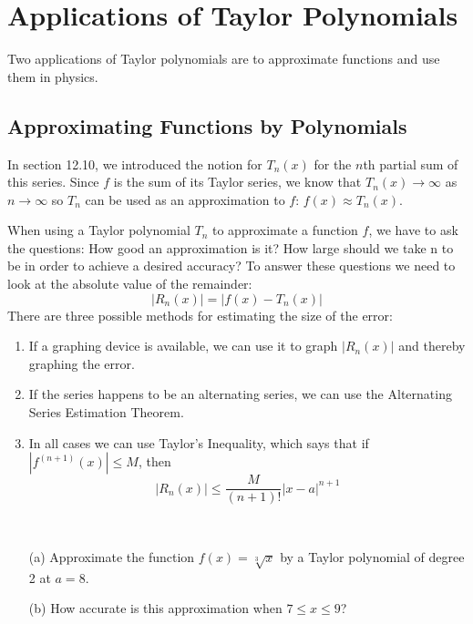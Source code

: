 \section{Applications of Taylor Polynomials}
  Two applications of Taylor polynomials are to approximate functions and use them in physics.
  \subsection*{Approximating Functions by Polynomials}
    In section 12.10, we introduced the notion for $T_n (x)$ for the $n$th partial sum of this series. Since $f$ is the sum of its Taylor series, we know that $T_n (x) \to \infty$ as $n\to\infty$ so $T_n$ can be used as an approximation to $f$: $f(x) \approx T_n (x)$.\par
    When using a Taylor polynomial $T_n$ to approximate a function $f$, we have to ask the questions: How good an approximation is it? How large should we take n to be in order to achieve a desired accuracy? To answer these questions we need to look at the absolute value of the remainder:
    $$|R_n (x)| = |f(x) - T_n (x)|$$
    There are three possible methods for estimating the size of the error:
    \begin{enumerate}
      \item If a graphing device is available, we can use it to graph $|R_n (x)|$ and thereby graphing the error.
      \item If the series happens to be an alternating series, we can use the Alternating Series Estimation Theorem.
      \item In all cases we can use Taylor's Inequality, which says that if $|f^{(n+1)}(x)| \leq M$, then
      $$|R_n (x)| \leq \frac{M}{(n+1)!}|x-a|^{n+1}$$
    \end{enumerate}
    \begin{example}
      \hphantom{ }\\
      \begin{enumerate}
        \item[(a)] Approximate the function $f(x) = \sqrt[3]{x}$ by a Taylor polynomial of degree 2 at $a=8$.
        \item[(b)] How accurate is this approximation when $7 \leq x \leq 9$?
      \end{enumerate}
    \end{example}
